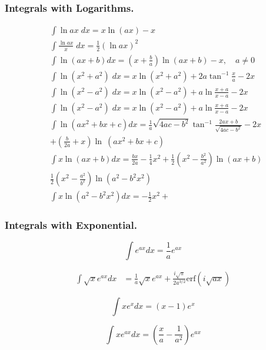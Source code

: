 \documentclass[../main.tex]{subfiles}
\begin{document}
\subsubsection*{Integrals with Logarithms.}

\begin{align*}
    &\int \ln ax \;dx = x \ln (ax) - x \\
    &\int \frac{\ln ax}{x} \;dx = \frac{1}{2} ( \ln ax )^2 \\
    &\int \ln (ax + b) dx =  ( x + \frac{b}{a} ) \ln (ax+b) - x , \quad a \neq 0\\
    &\int \ln  ( x^2 + a^2 )\;{dx} = x \ln (x^2 + a^2  ) +2a\tan^{-1} \frac{x}{a} - 2x\\
    &\int \ln  ( x^2 - a^2 )\;dx= x \ln (x^2 - a^2  ) +a\ln \frac{x+a}{x-a} - 2x\\
    &\int \ln  ( x^2 - a^2 )\;dx = x \ln (x^2 - a^2  ) +a\ln \frac{x+a}{x-a} - 2x \\
    &\int \ln  ( ax^2 + bx + c) dx  = \frac{1}{a}\sqrt{4ac-b^2}\tan^{-1}\frac{2ax+b}{\sqrt{4ac-b^2}} -2x\\
    &+ ( \frac{b}{2a}+x )\ln \ (ax^2+bx+c ) \\
    &\int x \ln (ax + b) dx = \frac{bx}{2a}-\frac{1}{4}x^2+\frac{1}{2}(x^2-\frac{b^2}{a^2})\ln (ax+b) \\
    &\frac{1}{2}( x^2 - \frac{a^2}{b^2}  ) \ln  (a^2 -b^2 x^2 )\\
    &\int x \ln  ( a^2 - b^2 x^2  ) dx = -\frac{1}{2}x^2+ 
\end{align*}
    
\subsubsection*{Integrals with Exponential.}
    
    \begin{equation*}
    \int e^{ax} dx = \frac{1}{a}e^{ax} 
    \end{equation*}
    
    \begin{align*}
    \int \sqrt{x} e^{ax} dx &= \frac{1}{a}\sqrt{x}e^{ax} 
    +\frac{i\sqrt{\pi}}{2a^{3/2}}
    \text{erf}\left(i\sqrt{ax}\right)
    \end{align*}
    
    \begin{equation*}
    \int x e^x dx = (x-1) e^x 
    \end{equation*}
    
    \begin{equation*}
    \int x e^{ax} dx = \left(\frac{x}{a}-\frac{1}{a^2}\right) e^{ax} 
    \end{equation*}
    
\end{document}

